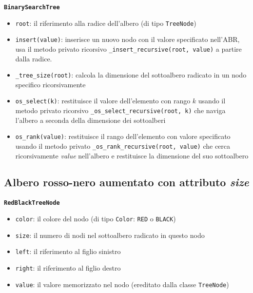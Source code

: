 \documentclass[onecolumn]{article}
\begin{document}
{\setlength{\parindent}{0em} \texttt{\textbf{BinarySearchTree}}}
\begin{itemize}
	\setlength\itemsep{0em}
	\item \verb|root|: il riferimento alla radice dell'albero (di tipo \texttt{TreeNode})
	\item \verb|insert(value)|: inserisce un nuovo nodo con il valore specificato nell'ABR, usa il metodo privato ricorsivo \verb|_insert_recursive(root, value)| a partire dalla radice.
	\item \verb|_tree_size(root)|: calcola la dimensione del sottoalbero radicato in un nodo specifico ricorsivamente
	\item \verb|os_select(k)|: restituisce il valore dell'elemento con rango $k$ usando il metodo privato ricorsivo \verb|_os_select_recursive(root, k)| che naviga l'albero a seconda della dimensione dei sottoalberi 
	\item \verb|os_rank(value)|: restituisce il rango dell'elemento con valore specificato  usando il metodo privato \verb|_os_rank_recursive(root, value)| che cerca ricorsivamente \textit{value} nell'albero e restituisce la dimensione del suo sottoalbero
\end{itemize}

\subsection{Albero rosso-nero aumentato con attributo \textit{size}}
\texttt{\textbf{RedBlackTreeNode}}
\begin{itemize}
	\setlength\itemsep{0em}
	\item \verb|color|: il colore del nodo (di tipo \texttt{Color}: \texttt{RED} o \texttt{BLACK})
	\item \verb|size|: il numero di nodi nel sottoalbero radicato in questo nodo
	\item \verb|left|: il riferimento al figlio sinistro
	\item \verb|right|: il riferimento al figlio destro
	\item \verb|value|: il valore memorizzato nel nodo (ereditato dalla classe \texttt{TreeNode})
\end{itemize}
\end{document}
